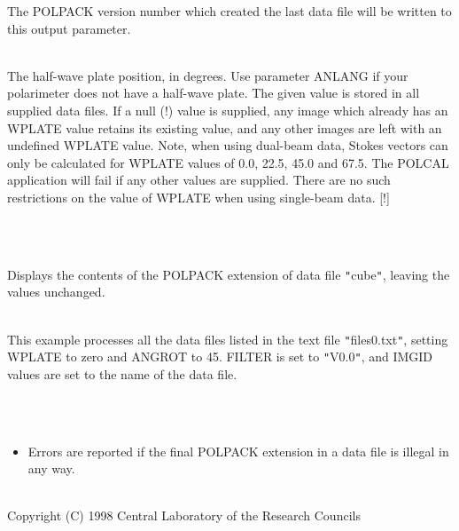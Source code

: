 \documentclass[twoside,11pt]{article}
\newcommand{\htmlref}[2]{#1}
\renewcommand{\_}{\texttt{\symbol{95}}}
\newlength{\sstexampleslength}
\newcommand{\sstexamples}[1]{
   \item[Examples:] \mbox{} \\
   \vspace{-3.5ex}
   \begin{description}
      #1
   \end{description}
}
\newcommand{\sstsubsection}[1]{ \item[{#1}] \mbox{} \\}
\newcommand{\sstexamplesubsection}[2]{\sloppy
\item[\parbox{\sstexampleslength}{\ssttt #1}] \mbox{} \vspace{1.0ex}
\\ #2 }
\newcommand{\sstnotes}[1]{\item[Notes:] \mbox{} \\[1.3ex] #1}
\newcommand{\sstdiytopic}[2]{\item[{\hspace{-0.35em}#1\hspace{-0.35em}:}]
\mbox{} \\[1.3ex] #2}
\newcommand{\sstitemlist}[1]{
  \mbox{} \\
  \vspace{-3.5ex}
  \begin{itemize}
     #1
  \end{itemize}
}
\newcommand{\sstitem}{\item}
\newcommand{\sstexamples}[1]{
      \item[Examples:] \\
      \begin{description}
         #1
      \end{description}
      \\
   }
\newcommand{\sstsubsection}[1]{\item[{#1}]}
\newcommand{\sstexamplesubsection}[2]{\item[{\ssttt #1}] #2}
\newcommand{\sstnotes}[1]{\item[Notes:] #1 }
\newcommand{\sstdiytopic}[2]{\item[{#1}] #2 }
\newcommand{\sstitemlist}[1]{
      \begin{itemize}
         #1
      \end{itemize}
      \\
   }
\newcommand{\sstitem}{\item}
\begin{document}
{{{      }{
         The POLPACK version number which created the last data file will be
         written to this output parameter.
      }
      \sstsubsection{
         WPLATE = \_REAL (Read)
      }{
         The half-wave plate position, in degrees. Use parameter ANLANG if
         your polarimeter does not have a half-wave plate. The given value
         is stored in all supplied data files. If a null (!) value is
         supplied, any image which already has an WPLATE value retains its
         existing value, and any other images are left with an undefined
         WPLATE value. Note, when using dual-beam data, Stokes vectors can
         only be calculated for WPLATE values of 0.0, 22.5, 45.0 and 67.5.
         The \htmlref{POLCAL}{POLCAL} application will fail if any other values are
         supplied. There are no such restrictions on the value of WPLATE
         when using single-beam data. [!]
      }
   }
   \sstexamples{
      \sstexamplesubsection{
         polext in=cube
      }{
         Displays the contents of the POLPACK extension of data file
         {\tt "}cube{\tt "}, leaving the values unchanged.
      }
      \sstexamplesubsection{
         polext in=$\wedge$files\_0.txt wplate=0 filter=V angrot=45
      }{
         This example processes all the data files listed in the text file
         {\tt "}files\_0.txt{\tt "}, setting WPLATE to zero and ANGROT to 45. FILTER
         is set to {\tt "}V\_0.0{\tt "}, and IMGID values are set to the name of the data
         file.
      }
   }
   \sstnotes{
      \sstitemlist{

         \sstitem
         Errors are reported if the final POLPACK extension in a data file
         is illegal in any way.
      }
   }
   \sstdiytopic{
      Copyright
   }{
      Copyright (C) 1998 Central Laboratory of the Research Councils
   }
}
\end{document}
